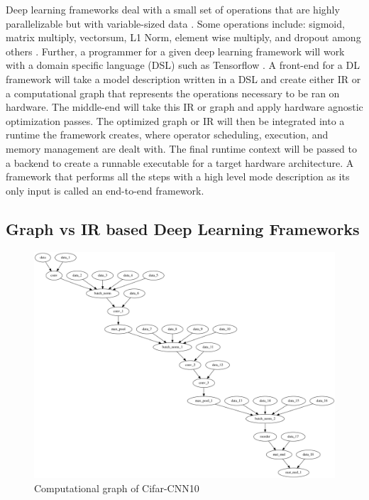 Deep learning frameworks deal with a small set of operations that are highly
parallelizable but with variable-sized data \cite{nGraph}. Some operations
include: sigmoid, matrix multiply, vectorsum, L1 Norm, element wise multiply,
and dropout among others \cite{cntk}. Further, a programmer for a given deep
learning framework will work with a domain specific language (DSL) such as
Tensorflow \cite{tensorflow}. A front-end for a DL framework will take a model
description written in a DSL and create either IR or a computational graph that
represents the operations necessary to be ran on hardware. The middle-end will
take this IR or graph and apply hardware agnostic optimization passes. The
optimized graph or IR will then be integrated into a runtime the framework
creates, where operator scheduling, execution, and memory management are dealt
with. The final runtime context will be passed to a backend to create a
runnable executable for a target hardware architecture.  A framework that
performs all the steps with a high level mode description as its only input is
called an end-to-end framework.





\subsection{Graph vs IR based Deep Learning Frameworks}

\begin{figure}[th]
\centering
\includegraphics[scale=0.3]{Figures/cnn_smv_dataflow_graph.png}
\decoRule
\caption[Computational Graph of CNN]{Computational graph of Cifar-CNN10}
\label{fig:comp_graph_cnn}
\end{figure}

